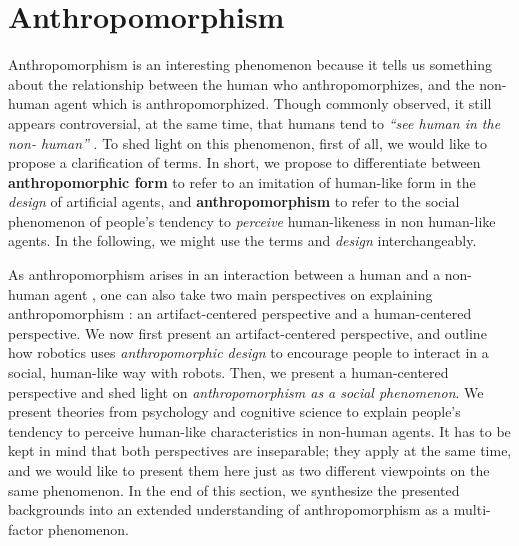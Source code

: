 \documentclass{frontiersSCNS} %
\begin{document}
%
%
%
%
%
%


\section{Anthropomorphism}
\label{sec:anthropomorphism}

Anthropomorphism is an interesting phenomenon because it tells us something about 
the relationship between the human who anthropomorphizes, and the non-human agent 
which is anthropomorphized. Though commonly observed, it still appears controversial, at 
the same time, that humans tend to \textit{``see human in the non-
human''} \citep{epley_seeing_2007}. 
To shed light on this phenomenon, first of all, we would like to propose a clarification of terms.
In short, we propose to differentiate between \textbf{anthropomorphic form} to refer to an imitation of human-like form in the \textit{design} of artificial agents, and  \textbf{anthropomorphism} to refer to the social phenomenon of 
people's tendency to \textit{perceive} human-likeness in non human-like agents.
\citep{fink_anthropomorphism_2012} In the following, we might use the terms  and \textit{design} interchangeably.

As anthropomorphism arises in an interaction between a human and a non-human agent
\citep{persson_anthropomorphism_2000}, one can also
take two main perspectives on explaining anthropomorphism \citep{lee_human_2005}: an artifact-centered perspective and a human-centered perspective. 
We now first present an artifact-centered perspective, and outline how 
robotics uses \textit{anthropomorphic design} to encourage 
people to interact in a social, human-like way with robots.
Then, we present a human-centered 
perspective and shed light on \textit{anthropomorphism as a social phenomenon}. We present 
theories from psychology and cognitive science to explain people's tendency to 
perceive human-like characteristics in non-human agents.
It has to be kept in mind that both perspectives are inseparable; they apply at the 
same time, and we would like to present them here just as two different viewpoints 
on the same phenomenon.
In the end of this section, we synthesize 
the presented backgrounds into an extended understanding of anthropomorphism 
as a multi-factor phenomenon.


%
%
%
%
%
%
\end{document}
